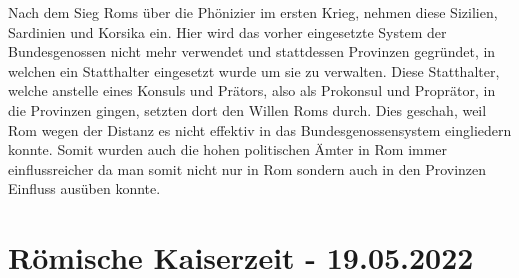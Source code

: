 \documentclass{article}
\begin{document}
	Nach dem Sieg Roms über die Phönizier im ersten Krieg, nehmen diese Sizilien, Sardinien und Korsika ein. Hier wird das vorher eingesetzte System der Bundesgenossen nicht mehr verwendet und stattdessen Provinzen gegründet, in welchen ein Statthalter eingesetzt wurde um sie zu verwalten. Diese Statthalter, welche anstelle eines Konsuls und Prätors, also als Prokonsul und Proprätor, in die Provinzen gingen, setzten dort den Willen Roms durch. Dies geschah, weil Rom wegen der Distanz es nicht effektiv in das Bundesgenossensystem eingliedern konnte. Somit wurden auch die hohen politischen Ämter in Rom immer einflussreicher da man somit nicht nur in Rom sondern auch in den Provinzen Einfluss ausüben konnte.

	\section{Römische Kaiserzeit - 19.05.2022}
\end{document}
